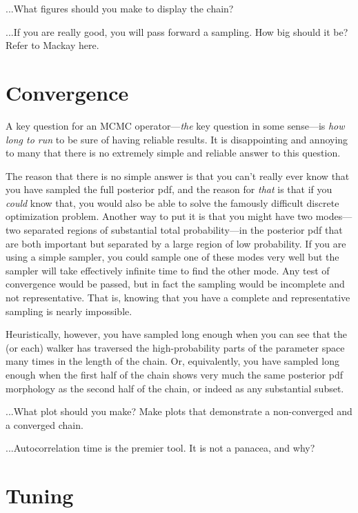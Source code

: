 \documentclass[12pt,twoside,pdftex]{article}
\begin{document}
...What figures should you make to display the chain?

...If you are really good, you will pass forward a sampling.  How big
should it be?  Refer to Mackay here.

\section{Convergence}

A key question for an MCMC operator---\emph{the} key question in some
sense---is \emph{how long to run} to be sure of having reliable
results.
It is disappointing and annoying to many that there is no extremely
simple and reliable answer to this question.

The reason that there is no simple answer is that you can't really
ever know that you have sampled the full posterior pdf, and the reason
for \emph{that} is that if you \emph{could} know that, you would also
be able to solve the famously difficult discrete optimization
problem.
Another way to put it is that you might have two modes---two separated
regions of substantial total probability---in the posterior pdf that
are both important but separated by a large region of low probability.
If you are using a simple sampler, you could sample one of these modes
very well but the sampler will take effectively infinite time to find
the other mode.
Any test of convergence would be passed, but in fact the sampling
would be incomplete and not representative.
That is, knowing that you have a complete and representative sampling
is nearly impossible.

Heuristically, however, you have sampled long enough when you can see
that the (or each) walker has traversed the high-probability parts of
the parameter space many times in the length of the chain.
Or, equivalently, you have sampled long enough when the first half of
the chain shows very much the same posterior pdf morphology as the
second half of the chain, or indeed as any substantial subset.

...What plot should you make?  Make plots that demonstrate a non-converged and a converged chain.

...Autocorrelation time is the premier tool.  It is not a panacea, and why?

\section{Tuning}
\end{document}
